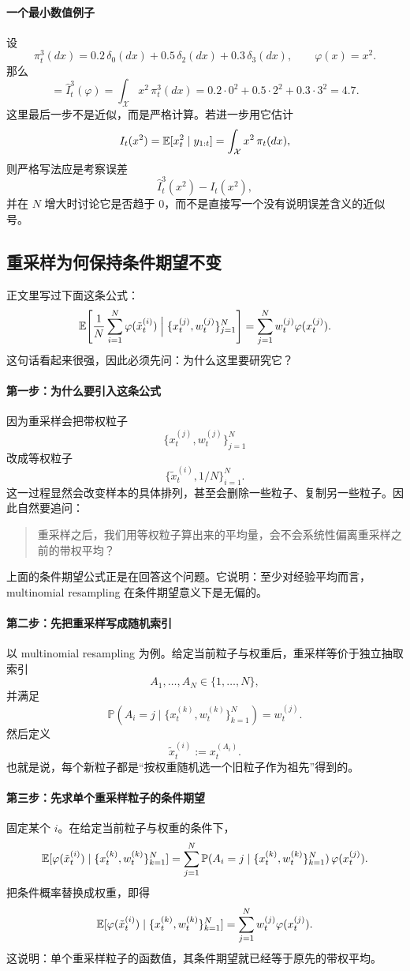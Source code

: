\documentclass[12pt,a4paper]{ctexart}
\begin{document}
\paragraph{一个最小数值例子}
设
\[
\pi_t^3(dx)=0.2\,\delta_0(dx)+0.5\,\delta_2(dx)+0.3\,\delta_3(dx),
\qquad
\varphi(x)=x^2.
\]
那么
\[
= \widehat{I}_t^3(\varphi)
= \int_{\mathcal X} x^2\,\pi_t^3(dx)
= 0.2\cdot 0^2 + 0.5\cdot 2^2 + 0.3\cdot 3^2
= 4.7.
\]
这里最后一步不是近似，而是严格计算。若进一步用它估计
\[
I_t(x^2)
= \mathbb{E}[x_t^2\mid y_{1:t}]
= \int_{\mathcal X} x^2\,\pi_t(dx),
\]
则严格写法应是考察误差
\[
\widehat{I}_t^3(x^2)-I_t(x^2),
\]
并在 \(N\) 增大时讨论它是否趋于 \(0\)，而不是直接写一个没有说明误差含义的近似号。

\subsection{重采样为何保持条件期望不变}\label{app:resampling-unbiased}

正文里写过下面这条公式：
\[
\mathbb{E}\!\left[\frac{1}{N}\sum_{i=1}^N \varphi(\tilde{x}_t^{(i)})
\Bigm| \{x_t^{(j)},w_t^{(j)}\}_{j=1}^N \right]
= \sum_{j=1}^N w_t^{(j)} \varphi(x_t^{(j)}).
\]
这句话看起来很强，因此必须先问：为什么这里要研究它？

\paragraph{第一步：为什么要引入这条公式}
因为重采样会把带权粒子
\[
\{x_t^{(j)},w_t^{(j)}\}_{j=1}^N
\]
改成等权粒子
\[
\{\tilde x_t^{(i)},1/N\}_{i=1}^N.
\]
这一过程显然会改变样本的具体排列，甚至会删除一些粒子、复制另一些粒子。因此自然要追问：
\begin{quote}
重采样之后，我们用等权粒子算出来的平均量，会不会系统性偏离重采样之前的带权平均？
\end{quote}
上面的条件期望公式正是在回答这个问题。它说明：至少对经验平均而言，multinomial resampling 在条件期望意义下是无偏的。

\paragraph{第二步：先把重采样写成随机索引}
以 multinomial resampling 为例。给定当前粒子与权重后，重采样等价于独立抽取索引
\[
A_1,\dots,A_N \in \{1,\dots,N\},
\]
并满足
\[
\mathbb P(A_i=j \mid \{x_t^{(k)},w_t^{(k)}\}_{k=1}^N)=w_t^{(j)}.
\]
然后定义
\[
\tilde x_t^{(i)} := x_t^{(A_i)}.
\]
也就是说，每个新粒子都是“按权重随机选一个旧粒子作为祖先”得到的。

\paragraph{第三步：先求单个重采样粒子的条件期望}
固定某个 \(i\)。在给定当前粒子与权重的条件下，
\[
\mathbb{E}[\varphi(\tilde x_t^{(i)}) \mid \{x_t^{(k)},w_t^{(k)}\}_{k=1}^N]
= \sum_{j=1}^N \mathbb P(A_i=j \mid \{x_t^{(k)},w_t^{(k)}\}_{k=1}^N)\,\varphi(x_t^{(j)}).
\]
把条件概率替换成权重，即得
\[
\mathbb{E}[\varphi(\tilde x_t^{(i)}) \mid \{x_t^{(k)},w_t^{(k)}\}_{k=1}^N]
= \sum_{j=1}^N w_t^{(j)} \varphi(x_t^{(j)}).
\]
这说明：单个重采样粒子的函数值，其条件期望就已经等于原先的带权平均。
\end{document}
